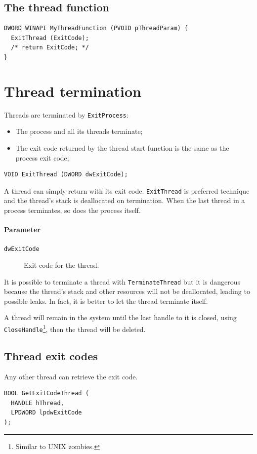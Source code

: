 \subsection{The thread function}
\begin{verbatim}
DWORD WINAPI MyThreadFunction (PVOID pThreadParam) {
  ExitThread (ExitCode);
  /* return ExitCode; */
}
\end{verbatim}

\section{Thread termination}
Threads are terminated by \texttt{ExitProcess}:
\begin{itemize}
\item The process and all its threads terminate;
\item The exit code returned by the thread start function is the same as the process exit code;
\end{itemize}

\begin{verbatim}
VOID ExitThread (DWORD dwExitCode);
\end{verbatim}
A thread can simply return with its exit code. \texttt{ExitThread} is preferred technique and the thread's stack is deallocated on termination. When the last thread in a process terminates, so does the process itself.

\paragraph{Parameter}
\begin{description}
\item [\texttt{dwExitCode}] Exit code for the thread.
\end{description}

It is possible to terminate a thread with \texttt{TerminateThread} but it is dangerous because the thread's stack and other resources will not be deallocated, leading to possible leaks. In fact, it is better to let the thread terminate itself.

A thread will remain in the system until the last handle to it is closed, using \texttt{CloseHandle}\footnote{Similar to UNIX zombies.}, then the thread will be deleted.

\subsection{Thread exit codes}
Any other thread can retrieve the exit code.
\begin{verbatim}
BOOL GetExitCodeThread (
  HANDLE hThread,
  LPDWORD lpdwExitCode
);
\end{verbatim}

